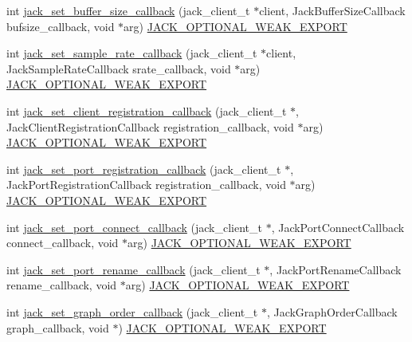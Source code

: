 \begin{DoxyCompactItemize}
int \hyperlink{group__ClientCallbacks_ga030cc371acb19abe52861492acb960ad}{jack\-\_\-set\-\_\-buffer\-\_\-size\-\_\-callback} (jack\-\_\-client\-\_\-t $\ast$client, \-Jack\-Buffer\-Size\-Callback bufsize\-\_\-callback, void $\ast$arg) \hyperlink{weakmacros_8h_adf1bde0dd996bbf61a44311165014dd1}{\-J\-A\-C\-K\-\_\-\-O\-P\-T\-I\-O\-N\-A\-L\-\_\-\-W\-E\-A\-K\-\_\-\-E\-X\-P\-O\-R\-T}
\item 
int \hyperlink{group__ClientCallbacks_gac1b3eb298cfa2869b8773c6cecf7f4b3}{jack\-\_\-set\-\_\-sample\-\_\-rate\-\_\-callback} (jack\-\_\-client\-\_\-t $\ast$client, \-Jack\-Sample\-Rate\-Callback srate\-\_\-callback, void $\ast$arg) \hyperlink{weakmacros_8h_adf1bde0dd996bbf61a44311165014dd1}{\-J\-A\-C\-K\-\_\-\-O\-P\-T\-I\-O\-N\-A\-L\-\_\-\-W\-E\-A\-K\-\_\-\-E\-X\-P\-O\-R\-T}
\item 
int \hyperlink{group__ClientCallbacks_ga51b01a31e56c92f4e2788a94840f0f37}{jack\-\_\-set\-\_\-client\-\_\-registration\-\_\-callback} (jack\-\_\-client\-\_\-t $\ast$, \-Jack\-Client\-Registration\-Callback registration\-\_\-callback, void $\ast$arg) \hyperlink{weakmacros_8h_adf1bde0dd996bbf61a44311165014dd1}{\-J\-A\-C\-K\-\_\-\-O\-P\-T\-I\-O\-N\-A\-L\-\_\-\-W\-E\-A\-K\-\_\-\-E\-X\-P\-O\-R\-T}
\item 
int \hyperlink{group__ClientCallbacks_ga30983a0478551a3cd20b71d692b24007}{jack\-\_\-set\-\_\-port\-\_\-registration\-\_\-callback} (jack\-\_\-client\-\_\-t $\ast$, \-Jack\-Port\-Registration\-Callback registration\-\_\-callback, void $\ast$arg) \hyperlink{weakmacros_8h_adf1bde0dd996bbf61a44311165014dd1}{\-J\-A\-C\-K\-\_\-\-O\-P\-T\-I\-O\-N\-A\-L\-\_\-\-W\-E\-A\-K\-\_\-\-E\-X\-P\-O\-R\-T}
\item 
int \hyperlink{group__ClientCallbacks_ga5312576d779c0664a7c703c87a9dba89}{jack\-\_\-set\-\_\-port\-\_\-connect\-\_\-callback} (jack\-\_\-client\-\_\-t $\ast$, \-Jack\-Port\-Connect\-Callback connect\-\_\-callback, void $\ast$arg) \hyperlink{weakmacros_8h_adf1bde0dd996bbf61a44311165014dd1}{\-J\-A\-C\-K\-\_\-\-O\-P\-T\-I\-O\-N\-A\-L\-\_\-\-W\-E\-A\-K\-\_\-\-E\-X\-P\-O\-R\-T}
\item 
int \hyperlink{group__ClientCallbacks_ga0c73095c1d8ebba413de6834bd7757b9}{jack\-\_\-set\-\_\-port\-\_\-rename\-\_\-callback} (jack\-\_\-client\-\_\-t $\ast$, \-Jack\-Port\-Rename\-Callback rename\-\_\-callback, void $\ast$arg) \hyperlink{weakmacros_8h_adf1bde0dd996bbf61a44311165014dd1}{\-J\-A\-C\-K\-\_\-\-O\-P\-T\-I\-O\-N\-A\-L\-\_\-\-W\-E\-A\-K\-\_\-\-E\-X\-P\-O\-R\-T}
\item 
int \hyperlink{group__ClientCallbacks_gacd0804ccef7c6891d8265bd88e7429ee}{jack\-\_\-set\-\_\-graph\-\_\-order\-\_\-callback} (jack\-\_\-client\-\_\-t $\ast$, \-Jack\-Graph\-Order\-Callback graph\-\_\-callback, void $\ast$) \hyperlink{weakmacros_8h_adf1bde0dd996bbf61a44311165014dd1}{\-J\-A\-C\-K\-\_\-\-O\-P\-T\-I\-O\-N\-A\-L\-\_\-\-W\-E\-A\-K\-\_\-\-E\-X\-P\-O\-R\-T}

\end{DoxyCompactItemize}
